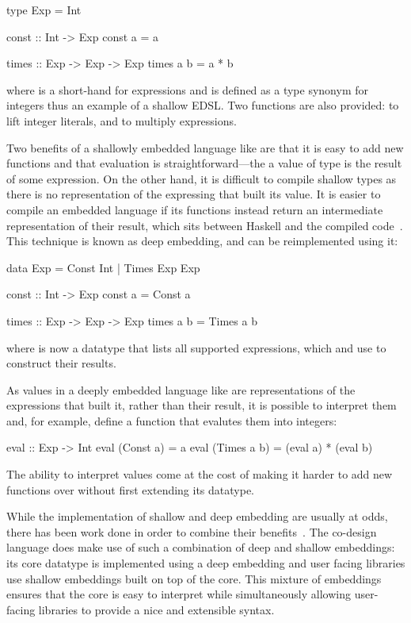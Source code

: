\documentclass[../paper.tex]{subfiles}
\begin{document}
\begin{code}
type Exp = Int

const :: Int -> Exp
const a = a

times :: Exp -> Exp -> Exp
times a b = a * b
\end{code}

\noindent where  is a short-hand for expressions and is defined as a type synonym for integers thus an example of a shallow EDSL. Two functions are also provided:  to lift integer literals, and  to multiply expressions.

Two benefits of a shallowly embedded language like  are that it is easy to add new functions and that evaluation is straightforward---the a value of type  is the result of some expression. On the other hand, it is difficult to compile shallow types as there is no representation of the expressing that built its value. It is easier to compile an embedded language if its functions instead return an intermediate representation of their result, which sits between Haskell and the compiled code~\cite{elliott2003}. This technique is known as deep embedding, and  can be reimplemented using it:

\begin{code}
data Exp = Const Int | Times Exp Exp

const :: Int -> Exp
const a = Const a

times :: Exp -> Exp -> Exp
times a b = Times a b
\end{code}

\noindent where  is now a datatype that lists all supported expressions, which  and  use to construct their results.

As values in a deeply embedded language like  are representations of the expressions that built it, rather than their result, it is possible to interpret them and, for example, define a function that evalutes them into integers:

\begin{code}
eval :: Exp -> Int
eval (Const a)   = a
eval (Times a b) = (eval a) * (eval b)
\end{code}

\noindent The ability to interpret values come at the cost of making it harder to add new functions over  without first extending its datatype.

While the implementation of shallow and deep embedding are usually at odds, there has been work done in order to combine their benefits~\cite{svenningsson2012}. The co-design language does make use of such a combination of deep and shallow embeddings: its core datatype is implemented using a deep embedding and user facing libraries use shallow embeddings built on top of the core. This mixture of embeddings ensures that the core is easy to interpret while simultaneously allowing user-facing libraries to provide a nice and extensible syntax.
\end{document}
